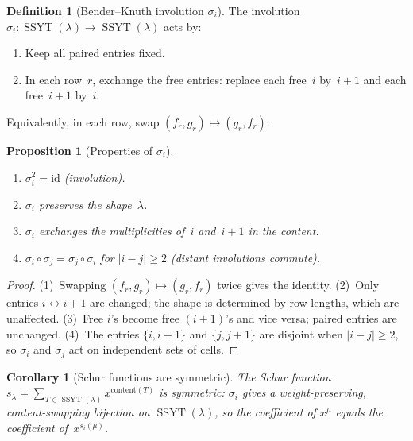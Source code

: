 \documentclass[11pt]{article}
\newcommand{\SSYT}{\operatorname{SSYT}}
\theoremstyle{plain}
\newtheorem{proposition}[theorem]{Proposition}
\newtheorem{corollary}[theorem]{Corollary}
\theoremstyle{definition}
\newtheorem{definition}[theorem]{Definition}
\begin{document}
\begin{definition}[Bender--Knuth involution $\sigma_i$]
\label{def:BK}
The involution $\sigma_i \colon \SSYT(\lambda) \to
\SSYT(\lambda)$ acts by:
\begin{enumerate}
  \item Keep all paired entries fixed.
  \item In each row~$r$, exchange the free entries:
    replace each free~$i$ by~$i + 1$ and each free~$i+1$
    by~$i$.
\end{enumerate}
Equivalently, in each row, swap $(f_r, g_r) \mapsto
(g_r, f_r)$.
\end{definition}

\begin{proposition}[Properties of $\sigma_i$]
\label{prop:BK-properties}
\mbox{}
\begin{enumerate}
  \item $\sigma_i^2 = \mathrm{id}$ \textup{(involution)}.
  \item $\sigma_i$ preserves the shape~$\lambda$.
  \item $\sigma_i$ exchanges the multiplicities of~$i$
    and~$i+1$ in the content.
  \item $\sigma_i \circ \sigma_j = \sigma_j \circ \sigma_i$
    for $|i - j| \geq 2$
    \textup{(distant involutions commute)}.
\end{enumerate}
\end{proposition}

\begin{proof}
(1)~Swapping $(f_r, g_r) \mapsto (g_r, f_r)$ twice gives the
identity.
(2)~Only entries $i \leftrightarrow i+1$ are changed; the
shape is determined by row lengths, which are unaffected.
(3)~Free $i$'s become free $(i+1)$'s and vice versa; paired
entries are unchanged.
(4)~The entries $\{i, i+1\}$ and $\{j, j+1\}$ are disjoint
when $|i-j| \geq 2$, so $\sigma_i$ and $\sigma_j$ act on
independent sets of cells.
\end{proof}

\begin{corollary}[Schur functions are symmetric]
\label{cor:schur-symmetric}
The Schur function
$s_\lambda = \sum_{T \in \SSYT(\lambda)}
x^{\mathrm{content}(T)}$ is symmetric: $\sigma_i$ gives a
weight-preserving, content-swapping bijection on
$\SSYT(\lambda)$, so the coefficient of $x^\mu$ equals the
coefficient of~$x^{s_i(\mu)}$.
\end{corollary}


\end{document}
